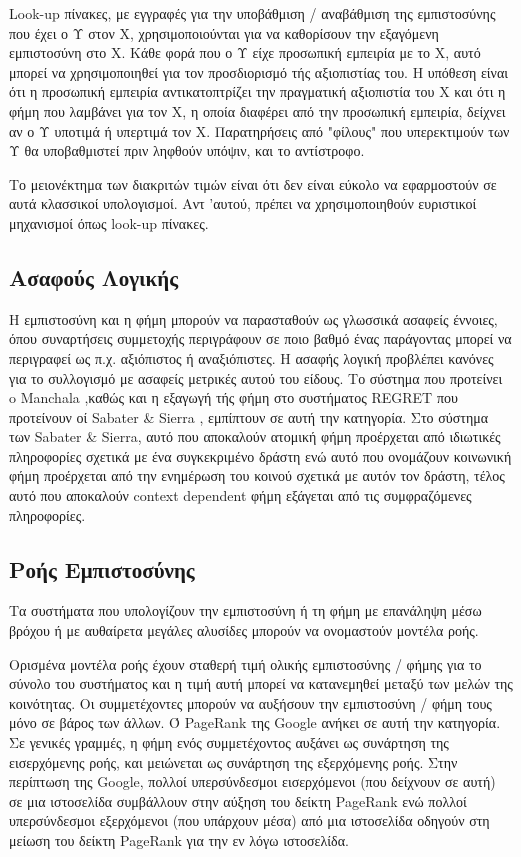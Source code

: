 Look-up πίνακες, με εγγραφές για την υποβάθμιση / αναβάθμιση της εμπιστοσύνης που έχει ο Υ στον Χ, χρησιμοποιούνται για να καθορίσουν την εξαγόμενη εμπιστοσύνη στο Χ. Κάθε φορά που ο Υ είχε προσωπική εμπειρία με το Χ, αυτό μπορεί να χρησιμοποιηθεί για τον προσδιορισμό τής αξιοπιστίας του. Η υπόθεση είναι ότι η προσωπική εμπειρία αντικατοπτρίζει την πραγματική αξιοπιστία του Χ και ότι η φήμη που λαμβάνει για τον Χ, η οποία διαφέρει από την προσωπική εμπειρία, δείχνει αν ο Υ υποτιμά ή υπερτιμά τον Χ. Παρατηρήσεις από "φίλους" που υπερεκτιμούν των Υ θα υποβαθμιστεί πριν ληφθούν υπόψιν, και το αντίστροφο.

Το μειονέκτημα των διακριτών τιμών είναι ότι δεν είναι εύκολο να εφαρμοστούν σε αυτά κλασσικοί υπολογισμοί. Αντ 'αυτού, πρέπει να χρησιμοποιηθούν ευριστικοί μηχανισμοί όπως look-up πίνακες.

\subsection{Ασαφούς Λογικής}

Η εμπιστοσύνη και η φήμη μπορούν να παρασταθούν ως γλωσσικά ασαφείς έννοιες, όπου συναρτήσεις συμμετοχής περιγράφουν σε ποιο βαθμό ένας παράγοντας μπορεί να περιγραφεί ως π.χ. αξιόπιστος ή αναξιόπιστες. Η ασαφής λογική προβλέπει κανόνες για το συλλογισμό με ασαφείς μετρικές αυτού του είδους. Το σύστημα που προτείνει o Manchala \cite{Manchala}
,καθώς και η εξαγωγή τής φήμη στο συστήματος REGRET που προτείνουν οί Sabater \& Sierra \cite{Sabater}, \cite{Sabater2}
 εμπίπτουν σε αυτή την κατηγορία. Στο σύστημα των Sabater \& Sierra, αυτό που αποκαλούν ατομική φήμη προέρχεται από ιδιωτικές πληροφορίες σχετικά με ένα συγκεκριμένο δράστη ενώ αυτό που ονομάζουν κοινωνική φήμη προέρχεται από την ενημέρωση του κοινού σχετικά με αυτόν τον δράστη, τέλος αυτό που αποκαλούν context dependent φήμη εξάγεται από τις συμφραζόμενες πληροφορίες.

\subsection{Ροής Εμπιστοσύνης}

Τα συστήματα που υπολογίζουν την εμπιστοσύνη ή τη φήμη με επανάληψη μέσω βρόχου ή με αυθαίρετα μεγάλες αλυσίδες μπορούν να ονομαστούν μοντέλα ροής.

Ορισμένα μοντέλα ροής έχουν σταθερή τιμή ολικής εμπιστοσύνης / φήμης για το σύνολο του συστήματος και η τιμή αυτή μπορεί να κατανεμηθεί μεταξύ των μελών της κοινότητας. Οι συμμετέχοντες μπορούν να αυξήσουν την εμπιστοσύνη / φήμη τους μόνο σε βάρος των άλλων. Ό PageRank της Google \cite{pagerank}
 ανήκει σε αυτή την κατηγορία. Σε γενικές γραμμές, η φήμη ενός συμμετέχοντος αυξάνει ως συνάρτηση της εισερχόμενης ροής, και μειώνεται ως συνάρτηση της εξερχόμενης ροής. Στην περίπτωση της Google, πολλοί υπερσύνδεσμοι εισερχόμενοι (που δείχνουν σε αυτή) σε μια ιστοσελίδα συμβάλλουν στην αύξηση του δείκτη PageRank ενώ πολλοί υπερσύνδεσμοι εξερχόμενοι (που υπάρχουν μέσα) από μια ιστοσελίδα οδηγούν στη μείωση του δείκτη PageRank για την εν λόγω ιστοσελίδα.

